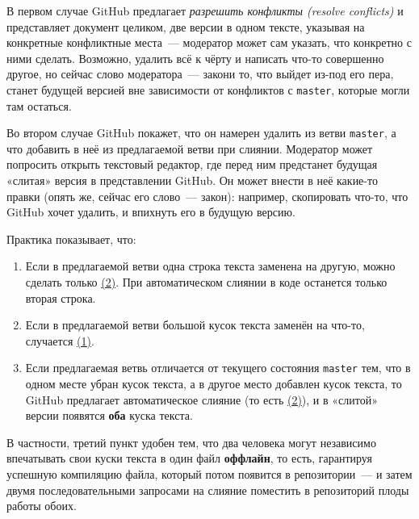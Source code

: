 \documentclass[12pt,a4paper,report]{ncc}
\begin{document}
\ms В первом случае GitHub предлагает {\it разрешить конфликты (resolve conflicts)} и представляет документ целиком, две версии в одном тексте, указывая на конкретные конфликтные места~— модератор может сам указать, что конкретно с ними сделать. Возможно, удалить всё к чёрту и написать что-то совершенно другое, но сейчас слово модератора~— закон\scolon и то, что выйдет из-под его пера, станет будущей версией вне зависимости от конфликтов с {\tt master}, которые могли там остаться.

\vfill\eject

\ms Во втором случае GitHub покажет, что он намерен удалить из ветви {\tt master}, а что добавить в неё из предлагаемой ветви при слиянии. Модератор может попросить открыть текстовый редактор, где перед ним предстанет будущая «слитая» версия в представлении GitHub. Он может внести в неё какие-то правки (опять же, сейчас его слово~— закон): например, скопировать что-то, что GitHub хочет удалить, и впихнуть его в будущую версию.

\ms Практика показывает, что:

\def\lnka{\hyperref[var1]{(1)}}
\def\lnkb{\hyperref[var2]{(2)}}

\begin{enumerate}

\item Если в предлагаемой ветви одна строка текста заменена на другую, можно сделать только \lnkb. При автоматическом слиянии в коде останется только вторая строка.

\item Если в предлагаемой ветви большой кусок текста заменён на что-то, случается \lnka.

\item Если предлагаемая ветвь отличается от текущего состояния {\tt master} тем, что в одном месте убран кусок текста, а в другое место добавлен кусок текста, то GitHub предлагает автоматическое слияние (то есть \lnkb), и в «слитой» версии появятся {\bf оба} куска текста.

\end{enumerate}

\ms В частности, третий пункт удобен тем, что два человека могут независимо впечатывать свои куски текста в один файл {\bf оффлайн}, то есть, гарантируя успешную компиляцию файла, который потом появится в репозитории~— и затем двумя последовательными запросами на слияние поместить в репозиторий плоды работы обоих.


\vfill\eject
$\phantom{.}$ \vspace{-0.3cm}
\end{document}
